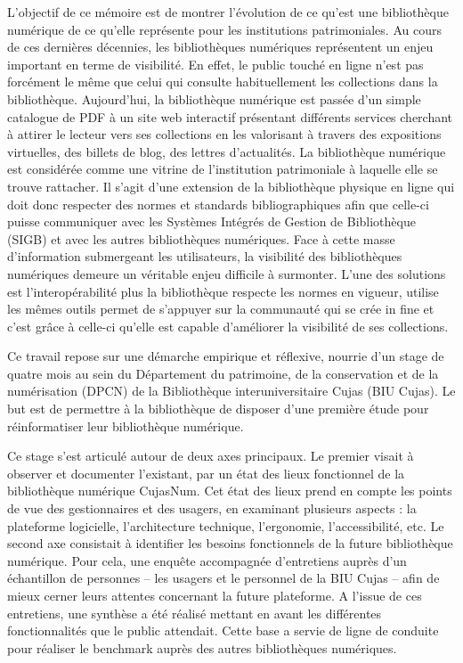 L'objectif de ce mémoire est de montrer l'évolution de ce qu'est une bibliothèque numérique de ce qu'elle représente pour les institutions patrimoniales. Au cours de ces dernières décennies, les bibliothèques numériques représentent un enjeu important en terme de visibilité. En effet, le public touché en ligne n'est pas forcément le même que celui qui consulte habituellement les collections dans la bibliothèque. Aujourd'hui, la bibliothèque numérique est passée d'un simple catalogue de PDF à un site web interactif présentant différents services cherchant à attirer le lecteur vers ses collections en les valorisant à travers des expositions virtuelles, des billets de blog, des lettres d'actualités. La bibliothèque numérique est considérée comme une vitrine de l'institution patrimoniale à laquelle elle se trouve rattacher. Il s'agit d'une extension de la bibliothèque physique en ligne qui doit donc respecter des normes et standards bibliographiques afin que celle-ci puisse communiquer avec les Systèmes Intégrés de Gestion de Bibliothèque (SIGB) et avec les autres bibliothèques numériques. Face à cette masse d'information submergeant les utilisateurs, la visibilité des bibliothèques numériques demeure un véritable enjeu difficile à surmonter. L'une des solutions est l'interopérabilité plus la bibliothèque respecte les normes en vigueur, utilise les mêmes outils permet de s'appuyer sur la communauté qui se crée in fine et c'est grâce à celle-ci qu'elle est capable d'améliorer la visibilité de ses collections.

\bigskip
Ce travail repose sur une démarche empirique et réflexive, nourrie d'un stage de quatre mois au sein du Département du patrimoine, de la conservation et de la numérisation (DPCN) de la Bibliothèque interuniversitaire Cujas (BIU Cujas). Le but est de permettre à la bibliothèque de disposer d'une première étude pour réinformatiser leur bibliothèque numérique.

Ce stage s'est articulé autour de deux axes principaux. Le premier visait à observer et documenter l'existant, par un état des lieux fonctionnel de la bibliothèque numérique CujasNum. Cet état des lieux prend en compte les points de vue des gestionnaires et des usagers, en examinant plusieurs aspects : la plateforme logicielle, l'architecture technique, l'ergonomie, l'accessibilité, etc. Le second axe consistait à identifier les besoins fonctionnels de la future bibliothèque numérique. Pour cela, une enquête accompagnée d'entretiens auprès d'un échantillon de personnes -- les usagers et le personnel de la BIU Cujas -- afin de mieux cerner leurs attentes concernant la future plateforme. A l'issue de ces entretiens, une synthèse a été réalisé mettant en avant les différentes fonctionnalités que le public attendait. Cette base a servie de ligne de conduite pour réaliser le benchmark auprès des autres bibliothèques numériques.

